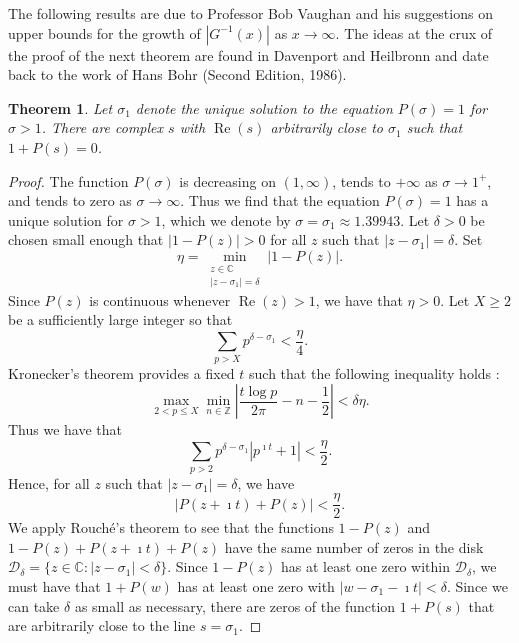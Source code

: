 \documentclass[11pt,reqno,a4letter]{article}
\numberwithin{figure}{section}
\numberwithin{table}{section}
\newcommand{\cf}{\textit{cf.\ }}
\theoremstyle{plain}
\newtheorem{theorem}{Theorem}
\numberwithin{theorem}{section}
\theoremstyle{definition}
\renewcommand{\Re}{\operatorname{Re}}
\begin{document}
The following results are due to Professor Bob Vaughan and his suggestions 
on upper bounds for the growth of $|G^{-1}(x)|$ as $x \rightarrow \infty$. 
The ideas at the crux of the proof of the next theorem 
are found in Davenport and Heilbronn \cite{DAVHEIL-1936A,DAVHEIL-1936B} 
and date back to the work of 
Hans Bohr \cite[\cf \S 11]{TITCHMARSH} (Second Edition, 1986). 

\begin{theorem}
\label{theorem_VaughanGrowthOfGInvxAndZerosOfPrimeZetaFunc_v1}
Let $\sigma_1$ denote the unique solution to the equation 
$P(\sigma) = 1$ for $\sigma > 1$. 
There are complex $s$ with $\Re(s)$ arbitrarily close to $\sigma_1$
such that $1+P(s) = 0$. 
\end{theorem}
\begin{proof}
The function $P(\sigma)$ is decreasing on $(1, \infty)$, 
tends to $+\infty$ as $\sigma \rightarrow 1^{+}$, and tends to zero as 
$\sigma \rightarrow \infty$. Thus we find that the equation $P(\sigma) = 1$ 
has a unique solution for $\sigma > 1$, which we denote by 
$\sigma = \sigma_1 \approx 1.39943$. 
Let $\delta > 0$ be chosen small enough that $|1-P(z)| > 0$ for all 
$z$ such that $|z-\sigma_1| = \delta$. Set 
\[
\eta = \min_{\substack{z \in \mathbb{C} \\ |z-\sigma_1|=\delta}} |1-P(z)|. 
\]
Since $P(z)$ is continuous whenever $\Re(z) > 1$, we have that 
$\eta > 0$. 
Let $X \geq 2$ be a sufficiently large integer so that 
\[
\sum_{p > X} p^{\delta-\sigma_1} < \frac{\eta}{4}. 
\]
Kronecker's theorem provides a fixed $t$ such that the 
following inequality holds \cite[\S XXIII]{HARDYWRIGHT}: 
\[
\max_{2 < p \leq X} \min_{n \in \mathbb{Z}} \left\lvert 
     \frac{t \log p}{2\pi} - n - \frac{1}{2} \right\rvert < \delta\eta. 
\]
Thus we have that 
\[
\sum_{p > 2} p^{\delta-\sigma_1} \left\lvert p^{\imath t} + 1 \right\rvert < 
     \frac{\eta}{2}. 
\]
Hence, for all $z$ such that $|z-\sigma_1|=\delta$, we have 
\[
\left\lvert P(z+\imath t) + P(z) \right\rvert < \frac{\eta}{2}. 
\]
We apply Rouch\'{e}'s theorem to see that the functions 
$1-P(z)$ and $1-P(z) + P(z+\imath t) + P(z)$ have the same number of zeros in 
the disk $\mathcal{D}_{\delta} = \{z \in \mathbb{C}: |z-\sigma_1| < \delta\}$. 
Since $1-P(z)$ has at least one zero within $\mathcal{D}_{\delta}$, we must have that 
$1+P(w)$ has at least one zero with $|w-\sigma_1-\imath t| < \delta$. 
Since we can take $\delta$ as small as necessary, 
there are zeros of the function $1+P(s)$ that are arbitrarily close to the 
line $s = \sigma_1$. 
\end{proof}
\end{document}
